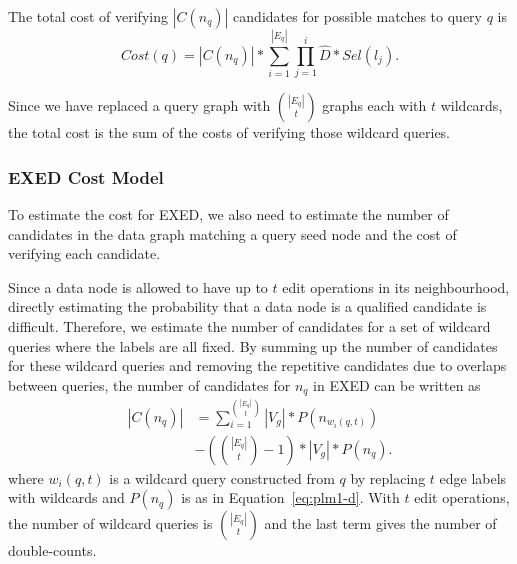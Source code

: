 \documentclass{sigmod}
\begin{document}
The total cost of verifying $|C(n_q)|$ candidates for possible matches to query $q$ is
\begin{equation}
\label{eq:cost-verifying-q}
Cost(q) = |C(n_q)| * \sum_{i=1}^{|E_q|}\prod_{j = 1}^i\hat{D}*Sel(l_j).
\end{equation}
  
Since we have replaced a query graph with ${|E_q| \choose t}$ graphs each with $t$ wildcards, the total cost is the sum of the costs of verifying those wildcard queries.


\subsubsection{EXED Cost Model}
To estimate the cost for  EXED, we also need to estimate  the number of candidates in the data graph matching a query seed node and the cost of verifying each candidate. 

Since a data node is allowed to have up to $t$ edit operations in its neighbourhood, directly estimating the probability that a data node is a qualified candidate is difficult. Therefore, we estimate the number of candidates for a set of wildcard queries where the labels are all fixed. 
By summing up the number of candidates for these wildcard queries and removing the repetitive candidates due to overlaps between queries,  the number of candidates for $n_q$ in EXED can be written as
\begin{align}
\label{eq:Cnq}
|C(n_q)| &= \sum_{i=1}^{|E_q| \choose t}|V_g| * P(n_{w_i(q,t)}) \nonumber\\
&- ({|E_q| \choose t} - 1) * |V_g| * P(n_q).
\end{align}
where $w_i(q,t)$ is a wildcard query constructed from $q$ by replacing $t$ edge labels with wildcards
and $P(n_q)$ is as in Equation~\ref{eq:plm1-d}. With $t$ edit operations, the number of wildcard queries is ${|E_q| \choose t}$ and the last term gives the number of double-counts.
\end{document}
